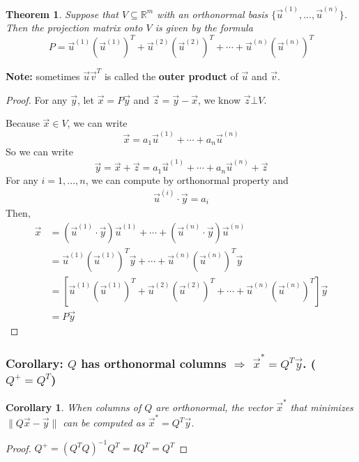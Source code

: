 \documentclass[11pt,a4paper]{article}
\newtheorem{theorem}{Theorem}
\newtheorem{corollary}{Corollary}
\begin{document}
\begin{theorem}
    Suppose that $V\subseteq \mathbb{R}^m$ with an orthonormal basis $\{\vec{u}^{(1)},...,\vec{u}^{(n)}\}$. Then the projection matrix onto $V$ is given by the formula
    $$P=\vec{u}^{(1)}(\vec{u}^{(1)})^T+\vec{u}^{(2)}(\vec{u}^{(2)})^T+\cdots+\vec{u}^{(n)}(\vec{u}^{(n)})^T$$
\end{theorem}
\textbf{Note:} sometimes $\vec{u}\vec{v}^T$ is called the \textbf{outer product} of $\vec{u}$ and $\vec{v}$.
\begin{proof}
    For any $\vec{y}$, let $\vec{x}=P\vec{y}$ and $\vec{z}=\vec{y}-\vec{x}$, we know $\vec{z}\bot V$.

    Because $\vec{x}\in V$, we can write $$\vec{x}=a_1 \vec{u}^{(1)} +\cdots+a_n \vec{u}^{(n)}$$
    So we can write $$\vec{y}=\vec{x}+\vec{z}=a_1 \vec{u}^{(1)} +\cdots+a_n \vec{u}^{(n)}+\vec{z}$$
    For any $i=1,...,n$, we can compute by orthonormal property and
    \begin{equation}
        \begin{aligned}
            \vec{u}^{(i)}\cdot \vec{y}= a_i
        \end{aligned}
        \nonumber
    \end{equation}
    Then,
    \begin{equation}
        \begin{aligned}
            \vec{x}&=(\vec{u}^{(1)}\cdot \vec{y}) \vec{u}^{(1)} +\cdots+(\vec{u}^{(n)}\cdot \vec{y}) \vec{u}^{(n)}\\
            &=\vec{u}^{(1)}(\vec{u}^{(1)})^T\vec{y}+\cdots+\vec{u}^{(n)}(\vec{u}^{(n)})^T\vec{y}\\
            &=\left[\vec{u}^{(1)}(\vec{u}^{(1)})^T+\vec{u}^{(2)}(\vec{u}^{(2)})^T+\cdots+\vec{u}^{(n)}(\vec{u}^{(n)})^T\right]\vec{y}\\
            &=P\vec{y}
        \end{aligned}
        \nonumber
    \end{equation}
\end{proof}

\subsubsection{Corollary: $Q$ has orthonormal columns $\Rightarrow$ $\vec{x}^*=Q^T \vec{y}$. ($Q^+=Q^T$)}
\begin{corollary}
    When columns of $Q$ are orthonormal, the vector $\vec{x}^*$ that minimizes $\|Q \vec{x}-\vec{y}\|$ can be computed as $\vec{x}^*=Q^T \vec{y}$.
\end{corollary}
\begin{proof}
    $Q^+=(Q^TQ)^{-1}Q^T=I Q^T=Q^T$
\end{proof}
\end{document}
